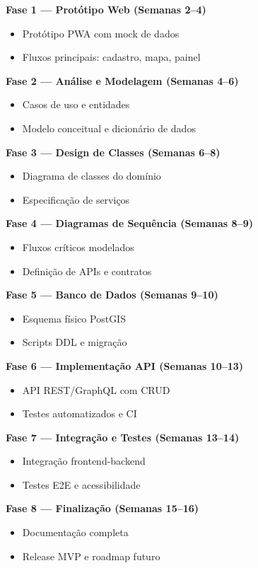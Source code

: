 \documentclass[12pt,a4paper]{article}
\begin{document}
\textbf{Fase 1 — Protótipo Web (Semanas 2–4)}
\begin{itemize}
    \item Protótipo PWA com mock de dados
    \item Fluxos principais: cadastro, mapa, painel
\end{itemize}

\textbf{Fase 2 — Análise e Modelagem (Semanas 4–6)}
\begin{itemize}
    \item Casos de uso e entidades
    \item Modelo conceitual e dicionário de dados
\end{itemize}

\textbf{Fase 3 — Design de Classes (Semanas 6–8)}
\begin{itemize}
    \item Diagrama de classes do domínio
    \item Especificação de serviços
\end{itemize}

\textbf{Fase 4 — Diagramas de Sequência (Semanas 8–9)}
\begin{itemize}
    \item Fluxos críticos modelados
    \item Definição de APIs e contratos
\end{itemize}

\textbf{Fase 5 — Banco de Dados (Semanas 9–10)}
\begin{itemize}
    \item Esquema físico PostGIS
    \item Scripts DDL e migração
\end{itemize}

\textbf{Fase 6 — Implementação API (Semanas 10–13)}
\begin{itemize}
    \item API REST/GraphQL com CRUD
    \item Testes automatizados e CI
\end{itemize}

\textbf{Fase 7 — Integração e Testes (Semanas 13–14)}
\begin{itemize}
    \item Integração frontend-backend
    \item Testes E2E e acessibilidade
\end{itemize}

\textbf{Fase 8 — Finalização (Semanas 15–16)}
\begin{itemize}
    \item Documentação completa
    \item Release MVP e roadmap futuro
\end{itemize}
\end{document}
